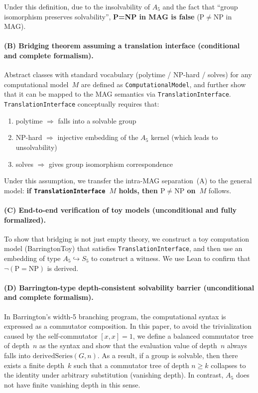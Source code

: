 \documentclass[11pt,a4paper]{article}
\theoremstyle{plain}
\theoremstyle{definition}
\newcommand{\Aalt}{A_5}
\newcommand{\Sfive}{S_5}
\newcommand{\TranslationInterface}{\texttt{TranslationInterface}}
\newcommand{\ComputationalModel}{\texttt{ComputationalModel}}
\begin{document}
Under this definition, due to the insolvability of $\Aalt$ and the fact that ``group isomorphism preserves solvability'', \textbf{P=NP in MAG is false} ($\mathrm{P} \neq \mathrm{NP}$ in MAG).

\paragraph{(B) Bridging theorem assuming a translation interface (conditional and complete formalism).}
Abstract classes with standard vocabulary (polytime / NP-hard / solves) for any computational model~$M$ are defined as \ComputationalModel{}, and further show that it can be mapped to the MAG semantics via \TranslationInterface{}. \TranslationInterface{} conceptually requires that:
\begin{enumerate}[nosep]
\item polytime $\Rightarrow$ falls into a solvable group
\item NP-hard $\Rightarrow$ injective embedding of the $\Aalt$ kernel (which leads to unsolvability)
\item solves $\Rightarrow$ gives group isomorphism correspondence
\end{enumerate}
Under this assumption, we transfer the intra-MAG separation~(A) to the general model: \textbf{if \TranslationInterface{}~$M$ holds, then $\mathrm{P} \neq \mathrm{NP}$ on~$M$} follows.

\paragraph{(C) End-to-end verification of toy models (unconditional and fully formalized).}
To show that bridging is not just empty theory, we construct a toy computation model (BarringtonToy) that satisfies \TranslationInterface{}, and then use an embedding of type $\Aalt \hookrightarrow \Sfive$ to construct a witness. We use Lean to confirm that $\neg(\mathrm{P}=\mathrm{NP})$ is derived.

\paragraph{(D) Barrington-type depth-consistent solvability barrier (unconditional and complete formalism).}
In Barrington's width-5 branching program, the computational syntax is expressed as a commutator composition. In this paper, to avoid the trivialization caused by the self-commutator $[x,x]=1$, we define a balanced commutator tree of depth~$n$ as the syntax and show that the evaluation value of depth~$n$ always falls into $\mathrm{derivedSeries}(G,n)$. As a result, if a group is solvable, then there exists a finite depth~$k$ such that a commutator tree of depth $n \geq k$ collapses to the identity under arbitrary substitution (vanishing depth). In contrast, $\Aalt$ does not have finite vanishing depth in this sense.
\end{document}
